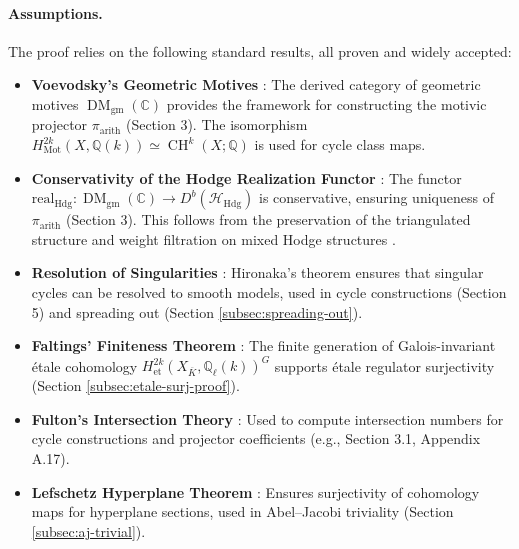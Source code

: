 \documentclass[11pt]{article}
\DeclareMathOperator{\CH}{CH}
\DeclareMathOperator{\Mot}{Mot}
\DeclareMathOperator{\DM}{DM}
\begin{document}
\paragraph{Assumptions.}
The proof relies on the following standard results, all proven and widely accepted:
\begin{itemize}
    \item \textbf{Voevodsky’s Geometric Motives} \cite{voevodsky2000}: The derived category of geometric motives \(\DM_{\mathrm{gm}}(\mathbb{C})\) provides the framework for constructing the motivic projector \(\pi_{\mathrm{arith}}\) (Section 3). The isomorphism \( H^{2k}_{\Mot}(X, \mathbb{Q}(k)) \simeq \CH^k(X; \mathbb{Q}) \) is used for cycle class maps.
    \item \textbf{Conservativity of the Hodge Realization Functor} \cite{cisinski2019triangulated}: The functor \(\mathrm{real}_{\mathrm{Hdg}}: \DM_{\mathrm{gm}}(\mathbb{C}) \to D^b(\mathcal{H}_{\mathrm{Hdg}})\) is conservative, ensuring uniqueness of \(\pi_{\mathrm{arith}}\) (Section 3). This follows from the preservation of the triangulated structure and weight filtration on mixed Hodge structures \cite{deligne1971}.
    \item \textbf{Resolution of Singularities} \cite{hironaka1964}: Hironaka’s theorem ensures that singular cycles can be resolved to smooth models, used in cycle constructions (Section 5) and spreading out (Section \ref{subsec:spreading-out}).
    \item \textbf{Faltings’ Finiteness Theorem} \cite{faltings1983}: The finite generation of Galois-invariant étale cohomology \( H^{2k}_{\mathrm{et}}(X_{\overline{K}}, \mathbb{Q}_\ell(k))^G \) supports étale regulator surjectivity (Section \ref{subsec:etale-surj-proof}).
    \item \textbf{Fulton’s Intersection Theory} \cite{fulton1984}: Used to compute intersection numbers for cycle constructions and projector coefficients (e.g., Section 3.1, Appendix A.17).
    \item \textbf{Lefschetz Hyperplane Theorem} \cite{griffiths1969}: Ensures surjectivity of cohomology maps for hyperplane sections, used in Abel–Jacobi triviality (Section \ref{subsec:aj-trivial}).
\end{itemize}
\end{document}
